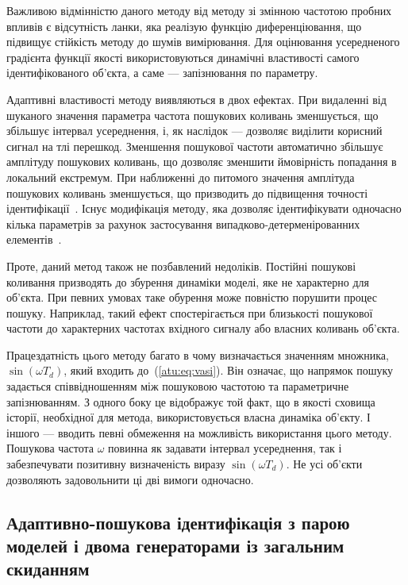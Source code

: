 Важливою відмінністю даного методу від методу зі змінною
частотою пробних впливів є відсутність
ланки, яка реалізую функцію
диференціювання,
що підвищує стійкість методу до шумів вимірювання. Для
оцінювання усередненого градієнта функції якості
використовуються динамічні властивості самого
ідентифікованого об'єкта, а саме --- запізнювання по параметру.

Адаптивні властивості методу виявляються в двох ефектах. При
видаленні від шуканого значення параметра частота пошукових
коливань зменшується, що збільшує інтервал усереднення,
і, як наслідок --- дозволяє виділити корисний сигнал на тлі
перешкод. Зменшення пошукової частоти автоматично збільшує
амплітуду пошукових коливань, що дозволяє зменшити ймовірність
попадання в локальний екстремум. При наближенні до питомого
значення амплітуда пошукових коливань зменшується, що
призводить до підвищення точності
ідентифікації~\cite{mai_sear_meth_akt_id_ns,mai_syntez_adop_id,bodyan_adapt_viyavl}.
Існує модифікація методу, яка дозволяє ідентифікувати
одночасно кілька параметрів за рахунок застосування
випадково-детерменірованних елементів~\cite{mich_92, mich_upr_prost_mech}.

Проте, даний метод також не позбавлений недоліків. Постійні
пошукові коливання призводять до збурення динаміки моделі,
яке не характерно для об'єкта. При певних умовах таке обурення
може повністю порушити процес пошуку. Наприклад, такий
ефект спостерігається при близькості пошукової частоти до
характерних частотах вхідного сигналу або власних коливань
об'єкта.

Працездатність цього методу багато в чому визначається
значенням множника,
$ \sin(\omega T_d)$, який входить до~(\ref{atu:eq:vasi}).
Він означає, що напрямок пошуку задається
співвідношенням між пошуковою частотою та параметричне запізнюванням.
З одного боку це відображує той факт, що в якості сховища історії,
необхідної для метода, використовується власна динаміка об'єкту.
І іншого --- вводить певні
обмеження на можливість використання цього методу.
Пошукова частота $\omega$ повинна як задавати інтервал усереднення,
так і забезпечувати
позитивну визначеність виразу $ \sin(\omega T_d)$.
Не усі об'єкти дозволяють
задовольнити ці дві вимоги одночасно.



\subsection{Адаптивно-пошукова ідентифікація з парою моделей і двома генераторами із загальним скиданням}%


